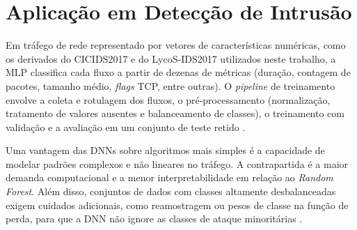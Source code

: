 \section{Aplicação em Detecção de Intrusão}

Em tráfego de rede representado por vetores de características numéricas, como os derivados do CICIDS2017 e do LycoS-IDS2017 utilizados neste trabalho, a MLP classifica cada fluxo a partir de dezenas de métricas (duração, contagem de pacotes, tamanho médio, \textit{flags} TCP, entre outras). O \textit{pipeline} de treinamento envolve a coleta e rotulagem dos fluxos, o pré-processamento (normalização, tratamento de valores ausentes e balanceamento de classes), o treinamento com validação e a avaliação em um conjunto de teste retido \cite{medeiros2019sbrc}.

Uma vantagem das DNNs sobre algoritmos mais simples é a capacidade de modelar padrões complexos e não lineares no tráfego. A contrapartida é a maior demanda computacional e a menor interpretabilidade em relação ao \textit{Random Forest}. Além disso, conjuntos de dados com classes altamente desbalanceadas exigem cuidados adicionais, como reamostragem ou pesos de classe na função de perda, para que a DNN não ignore as classes de ataque minoritárias \cite{medeiros2019sbrc}.
